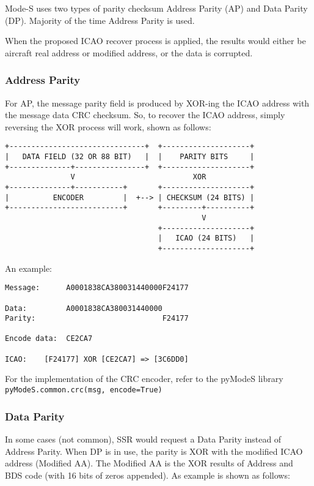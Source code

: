 Mode-S uses two types of parity checksum Address Parity (AP) and Data Parity (DP). Majority of the time Address Parity is used.

When the proposed ICAO recover process is applied, the results would either be aircraft real address or modified address, or the data is corrupted.

\subsubsection{Address Parity}\label{address-parity}

For AP, the message parity field is produced by XOR-ing the ICAO address with the message data CRC checksum. So, to recover the ICAO address, simply reversing the XOR process will work, shown as follows:

\begin{verbatim}
+-------------------------------+  +--------------------+
|   DATA FIELD (32 OR 88 BIT)   |  |    PARITY BITS     |
+--------------+----------------+  +--------------------+
               V                           XOR
+--------------+-----------+       +--------------------+
|          ENCODER         |  +--> | CHECKSUM (24 BITS) |
+--------------------------+       +---------+----------+
                                             V
                                   +--------------------+
                                   |   ICAO (24 BITS)   |
                                   +--------------------+
\end{verbatim}

An example:

\begin{verbatim}
Message:      A0001838CA380031440000F24177

Data:         A0001838CA380031440000
Parity:                             F24177

Encode data:  CE2CA7

ICAO:    [F24177] XOR [CE2CA7] => [3C6DD0]
\end{verbatim}

For the implementation of the CRC encoder, refer to the pyModeS library
\texttt{pyModeS.common.crc(msg,\ encode=True)}



\subsubsection{Data Parity}\label{data-parity}

In some cases (not common), SSR would request a Data Parity instead of Address Parity. When DP is in use, the parity is XOR with the modified ICAO address (Modified AA). The Modified AA is the XOR results of Address and BDS code (with 16 bits of zeros appended). As example is shown as follows:


